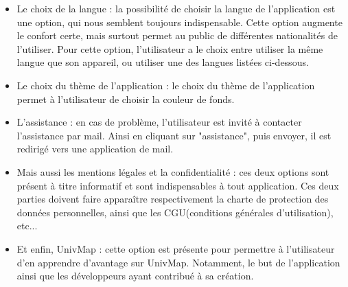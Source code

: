 \documentclass{article}
\begin{document}
\begin{itemize}
    \item Le choix de la langue : la possibilité de choisir la langue de l'application est une option, qui nous semblent toujours indispensable.
    Cette option augmente le confort certe, mais surtout permet au public de différentes nationalités de l'utiliser.
    Pour cette option, l'utilisateur a le choix entre utiliser la même langue que son appareil, ou utiliser une des langues listées ci-dessous.   

    \item Le choix du thème de l'application : le choix du thème de l'application permet à l'utilisateur de choisir la couleur de fonds.
    
    \item L'assistance : en cas de problème, l'utilisateur est invité à contacter l'assistance par mail. Ainsi en cliquant sur "assistance",
    puis envoyer, il est redirigé vers une application de mail. 
    
    \item Mais aussi les mentions légales et la confidentialité : ces deux options sont présent à titre informatif et sont indispensables à tout
    application. Ces deux parties doivent faire apparaître respectivement la charte de protection des données personnelles,
    ainsi que les CGU(conditions générales d'utilisation), etc...
    
    \item Et enfin, UnivMap : cette option est présente pour permettre à l'utilisateur d'en apprendre d'avantage sur UnivMap. Notamment,
    le but de l'application ainsi que les développeurs ayant contribué à sa création.
    
\end{itemize}

\vspace{10pt}   %
\end{document}
